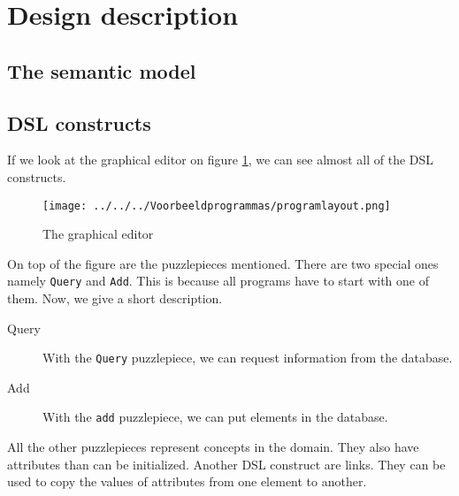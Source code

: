 \section{Design description}
\subsection{The semantic model}
\subsection{DSL constructs}
If we look at the graphical editor on figure \ref{ex:DSLlayoutinDD}, we can see almost all of the DSL constructs.
\begin{figure}[H]
	\centering
	\texttt{[image: ../../../Voorbeeldprogrammas/programlayout.png]}
	\caption{The graphical editor}
	\label{ex:DSLlayoutinDD}
\end{figure}
\noindent On top of the figure are the puzzlepieces mentioned. There are two special ones namely \texttt{Query} and \texttt{Add}. This is because all programs have to start with one of them.  Now, we give a short description.
\begin{description}
 \item[Query] With the \texttt{Query} puzzlepiece, we can request information from the database.
 \item[Add] With the \texttt{add} puzzlepiece, we can put elements in the database.  
\end{description}
All the other puzzlepieces represent concepts in the domain. They also have attributes than can be initialized.
Another DSL construct are links. They can be used to copy the values of attributes from one element to another.
